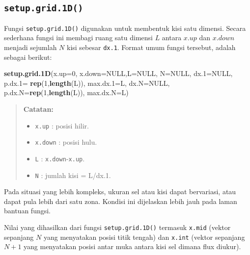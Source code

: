\documentclass[]{book}
\newenvironment{Shaded}{\begin{snugshade}}{\end{snugshade}}
\newcommand{\DataTypeTok}[1]{\textcolor[rgb]{0.13,0.29,0.53}{#1}}
\newcommand{\DecValTok}[1]{\textcolor[rgb]{0.00,0.00,0.81}{#1}}
\newcommand{\KeywordTok}[1]{\textcolor[rgb]{0.13,0.29,0.53}{\textbf{#1}}}
\newcommand{\NormalTok}[1]{#1}
\newcommand{\OtherTok}[1]{\textcolor[rgb]{0.56,0.35,0.01}{#1}}
\providecommand{\tightlist}{%
  \setlength{\itemsep}{0pt}\setlength{\parskip}{0pt}}
\theoremstyle{definition}
\theoremstyle{definition}
\theoremstyle{definition}
\theoremstyle{remark}
\begin{document}
\hypertarget{setup.grid.1d}{%
\subsection{\texorpdfstring{\texttt{setup.grid.1D()}}{setup.grid.1D()}}\label{setup.grid.1d}}

Fungsi \texttt{setup.grid.1D()} digunakan untuk membentuk kisi satu dimensi. Secara sederhana fungsi ini membagi ruang satu dimensi \(L\) antara \(x.up\) dan \(x.down\) menjadi sejumlah \(N\) kisi sebesar \texttt{dx.1}. Format umum fungsi tersebut, adalah sebagai berikut:

\begin{Shaded}
\begin{Highlighting}[]
\KeywordTok{setup.grid.1D}\NormalTok{(}\DataTypeTok{x.up=}\DecValTok{0}\NormalTok{, }\DataTypeTok{x.down=}\OtherTok{NULL}\NormalTok{,}\DataTypeTok{L=}\OtherTok{NULL}\NormalTok{, }
              \DataTypeTok{N=}\OtherTok{NULL}\NormalTok{, }\DataTypeTok{dx.1=}\OtherTok{NULL}\NormalTok{, }
              \DataTypeTok{p.dx.1=} \KeywordTok{rep}\NormalTok{(}\DecValTok{1}\NormalTok{,}\KeywordTok{length}\NormalTok{(L)), }
              \DataTypeTok{max.dx.1=}\NormalTok{L, }\DataTypeTok{dx.N=}\OtherTok{NULL}\NormalTok{, }
              \DataTypeTok{p.dx.N=}\KeywordTok{rep}\NormalTok{(}\DecValTok{1}\NormalTok{,}\KeywordTok{length}\NormalTok{(L)), }
              \DataTypeTok{max.dx.N=}\NormalTok{L)}
\end{Highlighting}
\end{Shaded}

\begin{quote}
\textbf{Catatan:}

\begin{itemize}
\tightlist
\item
  \texttt{x.up} : posisi hilir.
\item
  \texttt{x.down} : posisi hulu.
\item
  \texttt{L} : \texttt{x.down}-\texttt{x.up}.
\item
  \texttt{N} : jumlah kisi = L/dx.1.
\end{itemize}
\end{quote}

Pada situasi yang lebih kompleks, ukuran sel atau kisi dapat bervariasi, atau dapat pula lebih dari satu zona. Kondisi ini dijelaskan lebih jauh pada laman bantuan fungsi.

Nilai yang dihasilkan dari fungsi \texttt{setup.grid.1D()} termasuk \texttt{x.mid} (vektor sepanjang \(N\) yang menyatakan posisi titik tengah) dan \texttt{x.int} (vektor sepanjang \(N+1\) yang menyatakan posisi antar muka antara kisi sel dimana flux diukur).
\end{document}
